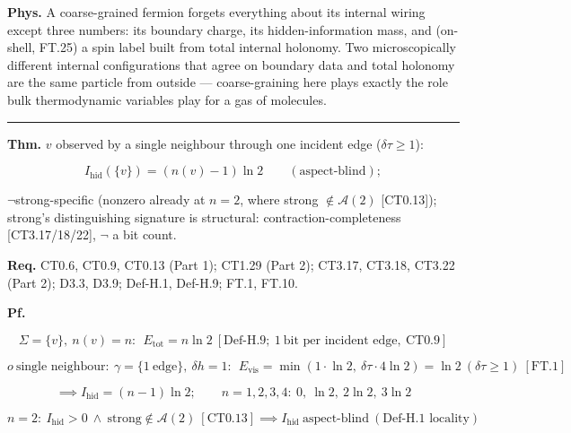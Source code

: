\begin{theorem}
\textbf{Phys.} A coarse-grained fermion forgets everything about its internal wiring except three numbers: its boundary charge, its hidden-information mass, and (on-shell, FT.25) a spin label built from total internal holonomy. Two microscopically different internal configurations that agree on boundary data and total holonomy are the same particle from outside — coarse-graining here plays exactly the role bulk thermodynamic variables play for a gas of molecules.

\vspace{2pt}\noindent\rule{\textwidth}{0.4pt}\vspace{2pt}

\end{theorem}

\begin{theorem}\label{tag:FT-16}
\textbf{Thm.} $v$ observed by a single neighbour through one incident edge ($\delta\tau\ge1$):

\[
I_{\mathrm{hid}}(\{v\})=(n(v)-1)\ln2\qquad(\text{aspect-blind});
\]

$\neg$strong-specific (nonzero already at $n=2$, where strong $\notin\mathcal A(2)$ [CT0.13]); strong's distinguishing signature is structural: contraction-completeness [CT3.17/18/22], $\neg$ a bit count.

\textbf{Req.} CT0.6, CT0.9, CT0.13 (Part 1); CT1.29 (Part 2); CT3.17, CT3.18, CT3.22 (Part 2); D3.3, D3.9; Def-H.1, Def-H.9; FT.1, FT.10.

\textbf{Pf.}

\[
\Sigma=\{v\},\ n(v)=n:\ \ E_{\mathrm{tot}}=n\ln2\ [\mathrm{Def\text{-}H.9};\ 1\ \text{bit per incident edge},\ \mathrm{CT0.9}]
\]

\[
o\ \text{single neighbour}:\ \gamma=\{1\ \text{edge}\},\ \delta h=1:\ \ E_{\mathrm{vis}}=\min(1\cdot\ln2,\ \delta\tau\cdot4\ln2)=\ln2\ (\delta\tau\ge1)\ [\mathrm{FT.1}]
\]

\[
\implies I_{\mathrm{hid}}=(n-1)\ln2;\qquad n=1,2,3,4:\ 0,\ \ln2,\ 2\ln2,\ 3\ln2
\]

\[
n=2:\ I_{\mathrm{hid}}>0\ \wedge\ \mathrm{strong}\notin\mathcal A(2)\ [\mathrm{CT0.13}]\implies I_{\mathrm{hid}}\ \text{aspect-blind}\ (\text{Def-H.1 locality})
\]


\end{theorem}
